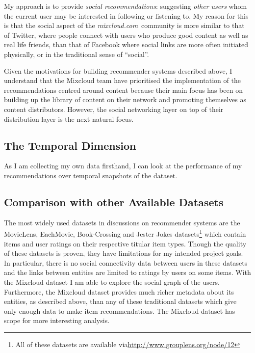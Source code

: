 \documentclass[a4paper,12pt,twoside,notitlepage]{report}
\def\mixurl{\emph{mixcloud.com}}
\newcommand{\todo}[1]{\ifdraft{\textsf{\color{red} TODO: #1}}\fi}
\begin{document}
My approach is to provide \emph{social recommendations}: suggesting \emph{other
users} whom the current user may be interested in following or listening to. My
reason for this is that the social aspect of the \mixurl\ community is more
similar to that of Twitter, where people connect with users who produce good
content as well as real life friends, than that of Facebook where social links
are more often initiated physically, or in the traditional sense of ``social''.

Given the motivations for building recommender systems described above, I
understand that the Mixcloud team have prioritised the implementation of 
the recommendations centred around content because their main
focus has been on building up the library of content on their network and
promoting themselves as content distributors. However, the social networking
layer on top of their distribution layer is the next natural focus. 

\subsection{The Temporal Dimension}

As I am collecting my own data firsthand, I can look at the performance of my
recommendations over temporal snapshots of the dataset.
\todo{more detail here?}
\subsection{Comparison with other Available Datasets}

The most widely used datasets in discussions on recommender systems are the 
MovieLens, EachMovie, Book-Crossing and Jester Jokes datasets\footnote{
All of these datasets are available via\url{http://www.grouplens.org/node/12}} 
which contain items and user ratings on their respective titular item types. 
Though the quality of these datasets is proven, they have limitations for my 
intended project goals. In particular, there is no social connectivity data 
between users in these datasets and the links between entities are limited to 
ratings by users on some items. With the Mixcloud dataset I am able to explore 
the social graph of the users. Furthermore, the Mixcloud dataset provides much 
richer metadata about its entities, as described above, than any of these 
traditional datasets which give only enough data to make item
recommendations. The Mixcloud dataset has scope for more interesting analysis.

\end{document}
